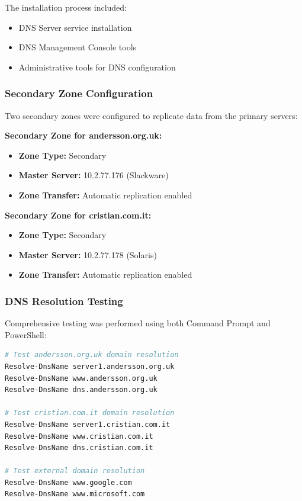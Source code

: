 \documentclass[12pt,a4paper]{article}
\begin{document}
The installation process included:
\begin{itemize}
    \item DNS Server service installation
    \item DNS Management Console tools
    \item Administrative tools for DNS configuration
\end{itemize}

\subsubsection{Secondary Zone Configuration}
Two secondary zones were configured to replicate data from the primary servers:

\textbf{Secondary Zone for andersson.org.uk:}
\begin{itemize}
    \item \textbf{Zone Type:} Secondary
    \item \textbf{Master Server:} 10.2.77.176 (Slackware)
    \item \textbf{Zone Transfer:} Automatic replication enabled
\end{itemize}

\textbf{Secondary Zone for cristian.com.it:}
\begin{itemize}
    \item \textbf{Zone Type:} Secondary
    \item \textbf{Master Server:} 10.2.77.178 (Solaris)
    \item \textbf{Zone Transfer:} Automatic replication enabled
\end{itemize}

\subsubsection{DNS Resolution Testing}
Comprehensive testing was performed using both Command Prompt and PowerShell:

\begin{lstlisting}[language=bash, caption=DNS Resolution Testing on Windows]
# Test andersson.org.uk domain resolution
Resolve-DnsName server1.andersson.org.uk
Resolve-DnsName www.andersson.org.uk
Resolve-DnsName dns.andersson.org.uk

# Test cristian.com.it domain resolution
Resolve-DnsName server1.cristian.com.it
Resolve-DnsName www.cristian.com.it
Resolve-DnsName dns.cristian.com.it

# Test external domain resolution
Resolve-DnsName www.google.com
Resolve-DnsName www.microsoft.com
\end{lstlisting}
\end{document}

